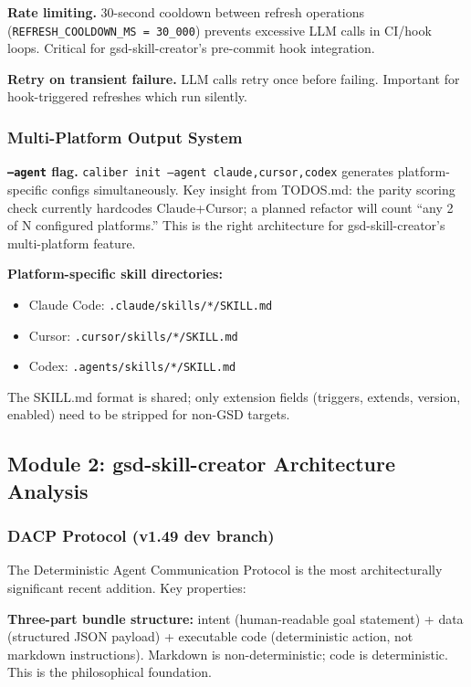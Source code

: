 \documentclass[11pt,letterpaper]{article}
\begin{document}
\textbf{Rate limiting.} 30-second cooldown between refresh operations (\texttt{REFRESH\_COOLDOWN\_MS = 30\_000}) prevents excessive LLM calls in CI/hook loops. Critical for gsd-skill-creator's pre-commit hook integration.

\textbf{Retry on transient failure.} LLM calls retry once before failing. Important for hook-triggered refreshes which run silently.

\subsubsection{Multi-Platform Output System}

\textbf{\texttt{--agent} flag.} \texttt{caliber init --agent claude,cursor,codex} generates platform-specific configs simultaneously. Key insight from TODOS.md: the parity scoring check currently hardcodes Claude+Cursor; a planned refactor will count ``any 2 of N configured platforms.'' This is the right architecture for gsd-skill-creator's multi-platform feature.

\textbf{Platform-specific skill directories:}
\begin{itemize}[leftmargin=1.5em]
  \item Claude Code: \texttt{.claude/skills/*/SKILL.md}
  \item Cursor: \texttt{.cursor/skills/*/SKILL.md}
  \item Codex: \texttt{.agents/skills/*/SKILL.md}
\end{itemize}

The SKILL.md format is shared; only extension fields (triggers, extends, version, enabled) need to be stripped for non-GSD targets.

\subsection{Module 2: gsd-skill-creator Architecture Analysis}

\subsubsection{DACP Protocol (v1.49 dev branch)}

The Deterministic Agent Communication Protocol is the most architecturally significant recent addition. Key properties:

\textbf{Three-part bundle structure:} intent (human-readable goal statement) + data (structured JSON payload) + executable code (deterministic action, not markdown instructions). Markdown is non-deterministic; code is deterministic. This is the philosophical foundation.
\end{document}
